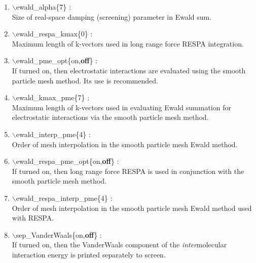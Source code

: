 \begin{itemize}
\begin{enumerate}
 \vspace{0.15in} \Large
 \item   $\backslash$ewald\_alpha\{7\} : \\
  \large
  Size of real-space damping (screening) parameter in Ewald sum.

 \vspace{0.15in} \Large
 \item   $\backslash$ewald\_respa\_kmax\{0\} : \\
  \large
   Maximum length of k-vectors used in long range force RESPA integration.

 \vspace{0.15in}\Large
 \item   $\backslash$ewald\_pme\_opt\{on,{\bf off}\} : \\
  \large
  If turned on, then electrostatic interactions are evaluated using the
  smooth particle mesh method.  Its use is recommended.

 \vspace{0.15in} \Large
 \item   $\backslash$ewald\_kmax\_pme\{7\} : \\
  \large
  Maximum length of k-vectors used in evaluating Ewald summation for 
  electrostatic interactions via the smooth particle mesh method.

 \vspace{0.15in} \Large
 \item   $\backslash$ewald\_interp\_pme\{4\} : \\
   \large
   Order of mesh interpolation in the smooth particle mesh Ewald method.

 \vspace{0.15in} \Large
 \item   $\backslash$ewald\_respa\_pme\_opt\{on,{\bf off}\} : \\
  \large
  If turned on, then long range force RESPA is used in conjunction with the
  smooth particle mesh method.

 \vspace{0.15in} \Large
 \item   $\backslash$ewald\_respa\_interp\_pme\{4\} : \\
  \large
  Order of mesh interpolation in the smooth particle mesh Ewald method used
  with RESPA.

 \vspace{0.15in}\Large
 \item   $\backslash$sep\_VanderWaals\{on,{\bf off}\} : \\
   \large
   If turned on, then the VanderWaals component of the {\it inter}molecular 
   interaction energy is printed separately to screen.


\end{enumerate}
\end{itemize}
